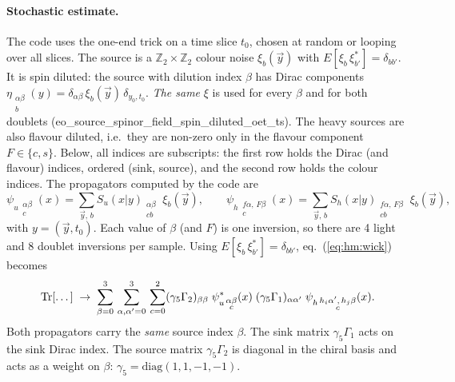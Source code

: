 \paragraph{Stochastic estimate.}
The code uses the one-end trick on a time slice $t_0$, chosen at random or looping over all slices.
The source is a $\mathbb Z_2\times\mathbb Z_2$ colour noise $\xi_b(\vec y)$ with $E[\xi_b\,\xi^*_{b'}]=\delta_{bb'}$.
It is spin diluted: the source with dilution index $\beta$ has Dirac components
$\eta_{\substack{\alpha\beta\\ b}}(y)=\delta_{\alpha\beta}\,\xi_b(\vec y)\,\delta_{y_0,t_0}$.
\emph{The same} $\xi$ is used for every $\beta$ and for both doublets
({\ttfamily eo\_source\_spinor\_field\_spin\_diluted\_oet\_ts}).
The heavy sources are also flavour diluted, i.e.\ they are non-zero only in the flavour component $F\in\{c,s\}$.
Below, all indices are subscripts: the first row holds the Dirac (and flavour) indices,
ordered (sink, source), and the second row holds the colour indices.
The propagators computed by the code are
\begin{equation}
  \psi_{u\,\substack{\alpha\beta\\ c}}(x) = \sum_{\vec y,\,b} S_u(x|y)_{\substack{\alpha\beta\\ cb}}\;\xi_b(\vec y) ,
  \qquad
  \psi_{h\,\substack{f\alpha,\,F\beta\\ c}}(x) = \sum_{\vec y,\,b} S_h(x|y)_{\substack{f\alpha,\,F\beta\\ cb}}\;\xi_b(\vec y) ,
\end{equation}
with $y=(\vec y,t_0)$. Each value of $\beta$ (and $F$) is one inversion,
so there are 4 light and 8 doublet inversions per sample.
Using $E[\xi_b\,\xi^*_{b'}]=\delta_{bb'}$, eq.~(\ref{eq:hm:wick}) becomes
\begin{equation}
  \operatorname{Tr}[\dots] \;\to\;
  \sum_{\beta=0}^{3}\,\sum_{\alpha,\alpha'=0}^{3}\,\sum_{c=0}^{2}
  (\gamma_5\Gamma_2)_{\beta\beta}\;
  \psi^*_{u\,\substack{\alpha\beta\\ c}}(x)\;
  (\gamma_5\Gamma_1)_{\alpha\alpha'}\;
  \psi_{h\,\substack{h_i\alpha',\,h_j\beta\\ c}}(x) .
  \label{eq:hm:stoch}
\end{equation}
Both propagators carry the \emph{same} source index $\beta$.
The sink matrix $\gamma_5\Gamma_1$ acts on the sink Dirac index.
The source matrix $\gamma_5\Gamma_2$ is diagonal in the chiral basis and acts as a weight on $\beta$:
$\gamma_5=\mathrm{diag}(1,1,-1,-1)$.

